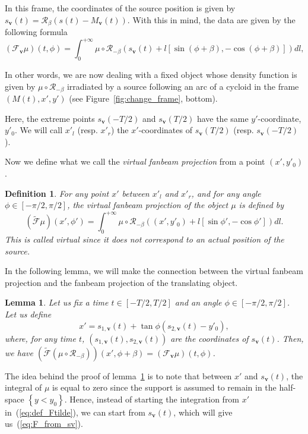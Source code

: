 \documentclass[twocolumn]{IEEEtran}
\newcommand{\bv}{\mathbf{v}}
\newcommand{\Mbv}{M_{\mathbf{v}}}
\newcommand{\Tbv}{\mathcal{F}_{\mathbf{v}}}
\newcommand{\sbv}{s_{\mathbf{v}}}
\newtheorem{definition}{Definition}
\newtheorem{lemma}{Lemma}
\begin{document}
In this frame, the coordinates of the source position is given by $\sbv(t)=\mathcal{R}_{\beta} \left( s(t)-\Mbv(t) \right)$. With this in mind, the data are given by the following formula
\begin{equation}
	(\Tbv\mu)(t,\phi) = \int_0^{+\infty} \mu \circ \mathcal{R}_{-\beta} \left( s_{\bv}(t) + l \left[ \sin (\phi + \beta), -\cos (\phi + \beta) \right] \right) dl,
\label{eq:F_from_sv}
\end{equation}

In other words, we are now dealing with a fixed object whose density function is given by $\mu \circ \mathcal{R}_{-\beta}$ irradiated by a source following an arc of a cycloid in the frame $\left(M(t), x', y'\right)$ (see Figure~\ref{fig:change_frame}, bottom).

Here, the extreme points $\sbv(-T/2)$ and $\sbv(T/2)$ have the same $y'$-coordinate, $y'_0$. We will call $x'_l$ (resp. $x'_r$) the $x'$-coordinates of $\sbv(T/2)$ (resp. $\sbv(-T/2)$).

Now we define what we call the \emph{virtual fanbeam projection} from a point $(x',y'_0)$.
\begin{definition}
	For any point $x'$ between $x'_l$ and $x'_r$, and for any angle $\phi \in \left[ -\pi/2, \pi/2\right]$, the \emph{virtual fanbeam projection} of the object $\mu$ is defined by
\begin{equation}
	\left( \tilde{\mathcal{F}} \mu	\right)(x',\phi') = \int_0^{+\infty} \mu \circ \mathcal{R}_{-\beta} \left( (x',y'_0) + l \left[ \sin \phi', -\cos \phi' \right] \right) dl.
\label{eq:def_Ftilde}
\end{equation}
This is called \emph{virtual} since it does not correspond to an actual position of the source.
\end{definition}

In the following lemma, we will make the connection between the virtual fanbeam projection and the fanbeam projection of the translating object.
\begin{lemma}
	Let us fix a time $t \in \left[ -T/2, T/2\right]$ and an angle $\phi \in \left[ -\pi/2, \pi/2\right]$. Let us define
	\begin{equation}
		x' = s_{1,\bv}(t) + \tan \phi \left( s_{2,\bv}(t) - y'_0 \right),
		\label{eq:x'}
	\end{equation}
	where, for any time $t$, $\left( s_{1,\bv}(t), s_{2,\bv}(t) \right)$ are the coordinates of $\sbv(t)$.
	Then, we have $\left( \tilde{\mathcal{F}} \left( \mu \circ \mathcal{R}_{-\beta} \right) \right)(x',\phi + \beta) = \left( \Tbv \mu \right)(t,\phi)$.
\label{lem:T_x_t}
\end{lemma}
The idea behind the proof of lemma~\ref{lem:T_x_t} is to note that between $x'$ and $\sbv(t)$, the integral of $\mu$ is equal to zero since the support is assumed to remain in the half-space $\left\{ y<y_0 \right\}$. Hence, instead of starting the integration from $x'$ in~(\ref{eq:def_Ftilde}), we can start from $\sbv(t)$, which will give us~(\ref{eq:F_from_sv}).
\end{document}
